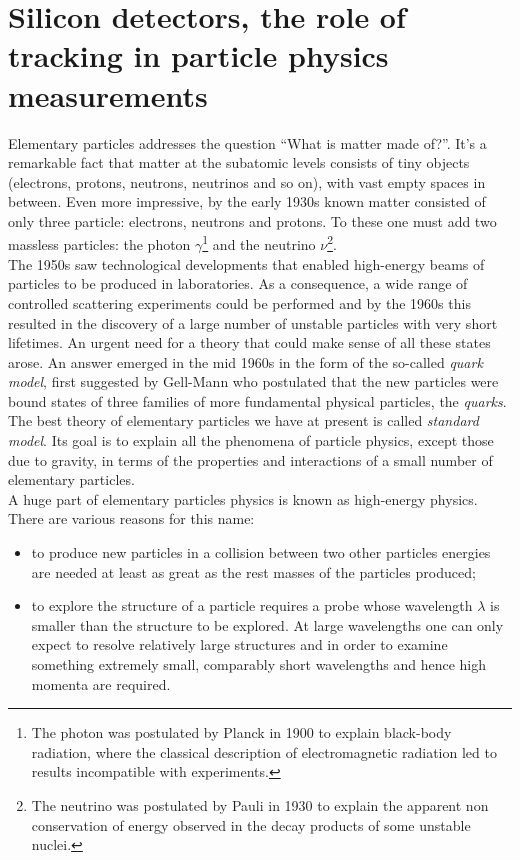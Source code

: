 \chapter{Silicon detectors, the role of tracking in particle physics
  measurements}


Elementary particles addresses the question ``What is matter made of?''. It's a
remarkable fact that matter at the subatomic levels consists of tiny objects
(electrons, protons, neutrons, neutrinos and so on), with vast empty spaces in
between. Even more impressive, by the early 1930s known matter consisted of only
three particle: electrons, neutrons and protons. To these one must add two
massless particles: the photon $\gamma$\footnote{The photon was postulated by
  Planck in 1900 to explain black-body radiation, where the classical
  description of electromagnetic radiation led to results incompatible with
  experiments.} and the neutrino $\nu$\footnote{The neutrino was postulated by
  Pauli in 1930 to explain the apparent non conservation
  of energy observed in the decay products of some unstable nuclei.}.\\
The 1950s saw technological developments that enabled high-energy beams of
particles to be produced in laboratories. As a consequence, a wide range of
controlled scattering experiments could be performed and by the 1960s this
resulted in the discovery of a large number of unstable particles with very
short lifetimes. An urgent need for a theory that could make sense of all these
states arose. An answer emerged in the mid 1960s in the form of the so-called
{\it quark model}, first suggested by Gell-Mann who postulated that the new
particles were bound states of three families of more fundamental
physical particles, the {\it quarks}.\\
The best theory of elementary particles we have at present is called {\it
  standard model}. Its goal is to explain all the phenomena of particle physics,
except those due to gravity, in terms of the
properties and interactions of a small number of elementary particles.\\
A huge part of elementary particles physics is known as high-energy
physics. There are various reasons for this name:
\begin{itemize}
\item to produce new particles in a collision between two other particles
  energies are needed at least as great as the rest masses of the particles
  produced;
\item to explore the structure of a particle requires a probe whose wavelength
  $\lambda$ is smaller than the structure to be explored.  At large wavelengths
  one can only expect to resolve relatively large structures and in order to
  examine something extremely small, comparably short wavelengths and hence high
  momenta are required.
\end{itemize}
